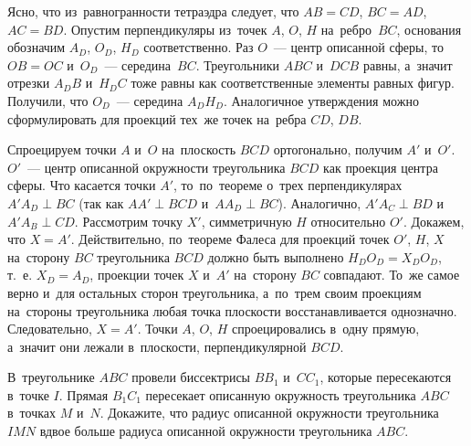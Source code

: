 \ifincludesolutions
Ясно, что из~равногранности тетраэдра следует, что $AB = CD$, $BC = AD$,
$AC = BD$.
Опустим перпендикуляры из~точек $A$, $O$, $H$ на~ребро~$BC$, основания
обозначим $A_D$, $O_D$, $H_D$ соответственно.
Раз $O$~--- центр описанной сферы, то~$OB = OC$ и~$O_D$~--- середина~$BC$.
Треугольники $ABC$ и~$DCB$ равны, а~значит отрезки $A_D B$ и~$H_D C$ тоже равны
как соответственные элементы равных фигур.
Получили, что $O_D$~--- середина $A_D H_D$.
Аналогичное утверждения можно сформулировать для проекций тех~же точек
на~ребра $CD$, $DB$.
\par
Спроецируем точки $A$ и~$O$ на~плоскость $BCD$ ортогонально, получим
$A'$ и~$O'$.
$O'$~--- центр описанной окружности треугольника $BCD$ как проекция центра
сферы.
Что касается точки $A'$, то~по~теореме о~трех перпендикулярах $A' A_D \perp BC$
(так как $AA' \perp BCD$ и~$A A_D \perp BC$).
Аналогично, $A' A_C \perp BD$ и~$A' A_B \perp CD$.
Рассмотрим точку $X'$, симметричную $H$ относительно $O'$.
Докажем, что $X = A'$.
Действительно, по~теореме Фалеса для проекций точек $O'$, $H$, $X$ на~сторону
$BC$ треугольника $BCD$ должно быть выполнено $H_DO_D = X_DO_D$, т.~е.
$X_D = A_D$, проекции точек $X$ и~$A'$ на~сторону $BC$ совпадают.
То~же самое верно и~для остальных сторон треугольника, а~по~трем своим
проекциям на~стороны треугольника любая точка плоскости восстанавливается
однозначно.
Следовательно, $X = A'$.
Точки $A$, $O$, $H$ спроецировались в~одну прямую, а~значит они лежали в~плоскости, перпендикулярной $BCD$.
\fi %

\begin{problems}

\item
В~треугольнике $ABC$ провели биссектрисы $B B_1$ и~$C C_1$, которые
пересекаются в~точке $I$.
Прямая $B_1 C_1$ пересекает описанную окружность треугольника $ABC$
в~точках $M$ и~$N$.
Докажите, что радиус описанной окружности треугольника $IMN$ вдвое больше
радиуса описанной окружности треугольника $ABC$.

\end{problems}

